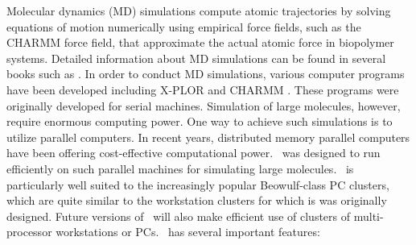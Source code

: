 Molecular dynamics (MD) simulations compute atomic trajectories by solving
equations of motion numerically using empirical force fields, such as the 
CHARMM force field, that approximate the actual atomic force in 
biopolymer systems. Detailed information about MD simulations can be found in
several books such as 
. 
In order to conduct MD simulations, various computer programs have been 
developed including
X-PLOR  and 
CHARMM .
These programs were originally developed for serial machines. 
Simulation of large molecules, however, require enormous computing power. 
One way to achieve such simulations is to utilize parallel computers. In recent 
years, distributed memory parallel computers have been offering
cost-effective computational power.  \NAMD\ was designed to run efficiently
on such parallel 
machines for simulating large molecules. 
\NAMD\ is particularly well suited to the increasingly popular Beowulf-class PC clusters, which are quite similar to the workstation clusters for which is was originally designed.
Future versions of \NAMD\ will also make efficient use of clusters of multi-processor workstations or PCs.
\prettypar
\NAMD\ has several important features: 

